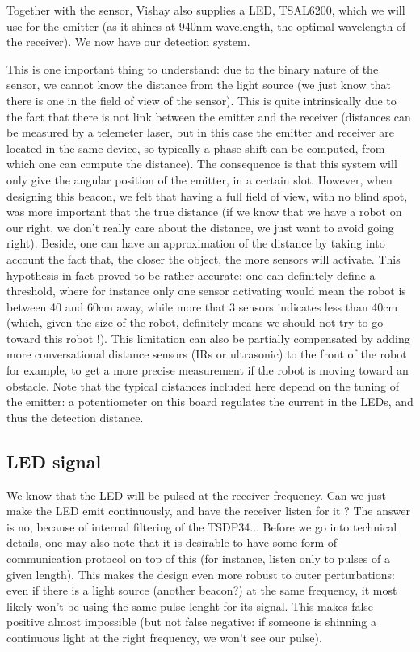 \documentclass[a4paper,11pt]{article}
\begin{document}
Together with the sensor, Vishay also supplies a LED, TSAL6200, which we will use for the emitter (as it shines at 940nm wavelength, the optimal wavelength of the receiver). We now have our detection system.

This is one important thing to understand: due to the binary nature of the sensor, we cannot know the distance from the light source (we just know that there is one in the field of view of the sensor). This is quite intrinsically due to the fact that there is not link between the emitter and the receiver (distances can be measured by a telemeter laser, but in this case the emitter and receiver are located in the same device, so typically a phase shift can be computed, from which one can compute the distance). The consequence is that this system will only give the angular position of the emitter, in a certain slot. However, when designing this beacon, we felt that having a full field of view, with no blind spot, was more important that the true distance (if we know that we have a robot on our right, we don't really care about the distance, we just want to avoid going right). Beside, one can have an approximation of the distance by taking into account the fact that, the closer the object, the more sensors will activate. This hypothesis in fact proved to be rather accurate: one can definitely define a threshold, where for instance only one sensor activating would mean the robot is between 40 and 60cm away, while more that 3 sensors indicates less than 40cm (which, given the size of the robot, definitely means we should not try to go toward this robot !). This limitation can also be partially compensated by adding more conversational distance sensors (IRs or ultrasonic) to the front of the robot for example, to get a more precise measurement if the robot is moving toward an obstacle. Note that the typical distances included here depend on the tuning of the emitter: a potentiometer on this board regulates the current in the LEDs, and thus the detection distance.

\subsection{LED signal}

We know that the LED will be pulsed at the receiver frequency. Can we just make the LED emit continuously, and have the receiver listen for it ? The answer is no, because of internal filtering of the TSDP34... Before we go into technical details, one may also note that it is desirable to have some form of communication protocol on top of this (for instance, listen only to pulses of a given length). This makes the design even more robust to outer perturbations: even if there is a light source (another beacon?) at the same frequency, it most likely won't be using the same pulse lenght for its signal. This makes false positive almost impossible (but not false negative: if someone is shinning a continuous light at the right frequency, we won't see our pulse).
\end{document}
